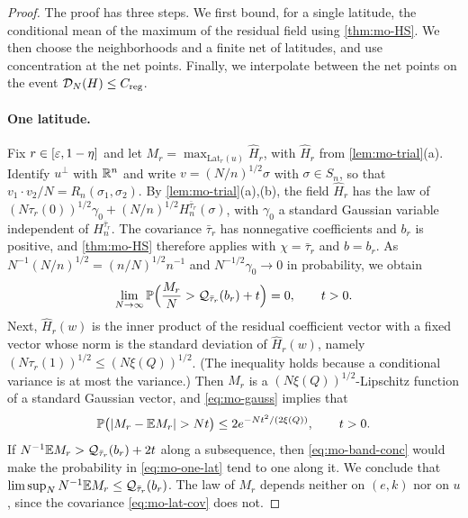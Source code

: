\begin{proof}
The proof has three steps. We first bound, for a single latitude, the conditional mean of the maximum of the residual field using \cref{thm:mo-HS}. We then choose the neighborhoods and a finite net of latitudes, and use concentration at the net points. Finally, we interpolate between the net points on the event $\mathcal D_N(H)\le C_{\rm reg}$.

\paragraph{One latitude.}
Fix $r\in[\varepsilon,1-\eta]$ and let $M_r=\max_{\mathrm{Lat}_r(u)}\widehat H_r$, with $\widehat H_r$ from \cref{lem:mo-trial}(a). Identify $u^\perp$ with $\mathbb R^n$ and write $v=(N/n)^{1/2}\sigma$ with $\sigma\in S_n$, so that $v_1\cdot v_2/N=R_n(\sigma_1,\sigma_2)$. By \cref{lem:mo-trial}(a),(b), the field $\widehat H_r$ has the law of $(N\tau_r(0))^{1/2}\gamma_0+(N/n)^{1/2}H_n^{\bar\tau_r}(\sigma)$, with $\gamma_0$ a standard Gaussian variable independent of $H_n^{\bar\tau_r}$. The covariance $\bar\tau_r$ has nonnegative coefficients and $b_r$ is positive, and \cref{thm:mo-HS} therefore applies with $\chi=\bar\tau_r$ and $b=b_r$. As $N^{-1}(N/n)^{1/2}=(n/N)^{1/2}n^{-1}$ and $N^{-1/2}\gamma_0\to0$ in probability, we obtain
\begin{equation}\label{eq:mo-one-lat}
\lim_{N\to\infty}\mathbb P\Bigl(\frac{M_r}N>\mathcal Q_{\bar\tau_r}(b_r)+t\Bigr)=0,\qquad t>0.
\end{equation}
Next, $\widehat H_r(w)$ is the inner product of the residual coefficient vector with a fixed vector whose norm is the standard deviation of $\widehat H_r(w)$, namely $(N\tau_r(1))^{1/2}\le(N\xi(Q))^{1/2}$. (The inequality holds because a conditional variance is at most the variance.) Then $M_r$ is a $(N\xi(Q))^{1/2}$-Lipschitz function of a standard Gaussian vector, and \eqref{eq:mo-gauss} implies that
\begin{equation}\label{eq:mo-band-conc}
\Pp\bigl(|M_r-\E M_r|>Nt\bigr)\le2e^{-Nt^2/(2\xi(Q))},\qquad t>0.
\end{equation}
If $N^{-1}\mathbb E M_r>\mathcal Q_{\bar\tau_r}(b_r)+2t$ along a subsequence, then \eqref{eq:mo-band-conc} would make the probability in \eqref{eq:mo-one-lat} tend to one along it. We conclude that $\limsup_NN^{-1}\mathbb E M_r\le\mathcal Q_{\bar\tau_r}(b_r)$. The law of $M_r$ depends neither on $(e,k)$ nor on $u$, since the covariance \eqref{eq:mo-lat-cov} does not.


\end{proof}
